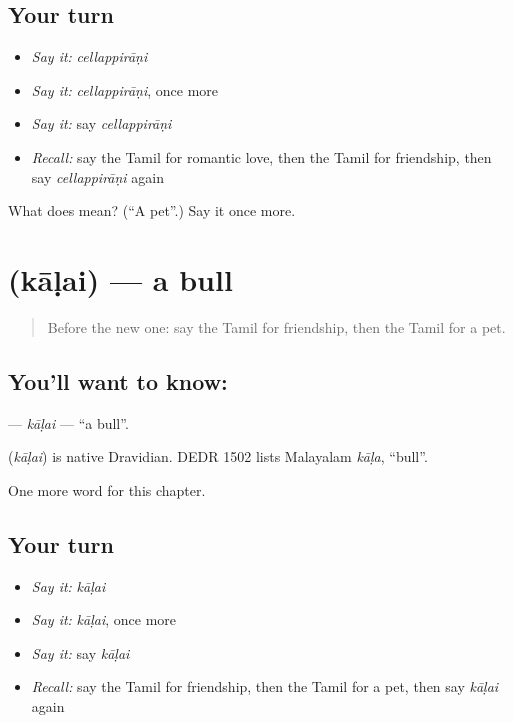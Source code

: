 \subsection*{Your turn}
\begin{itemize}
\raggedright
  \item \emph{Say it:} \emph{cellappirāṇi}
  \item \emph{Say it:} \emph{cellappirāṇi}, once more
  \item \emph{Say it:} say \emph{cellappirāṇi}
  \item \emph{Recall:} say the Tamil for romantic love, then the Tamil for friendship, then say \emph{cellappirāṇi} again
\end{itemize}

\begin{tcolorbox}[breakable,colback=teal!4,colframe=teal!35!black,title={Before you move on}]
What does  mean? (\textquotedblleft{}A pet\textquotedblright{}.) Say it once more.
\end{tcolorbox}
\section[\texorpdfstring{\ta{காளை} (kāḷai)}{காளை (kāḷai)}]{ (kāḷai) — a bull}

\label{lesson:TA-C187-kalai}



\begin{quote}
Before the new one: say the Tamil for friendship, then the Tamil for a pet.
\end{quote}

\subsection*{You'll want to know: }
\textbf{} — \emph{kāḷai} — \textquotedblleft{}a bull\textquotedblright{}.

\begin{cousinweb}
\textbf{} (\emph{kāḷai}) is native Dravidian. DEDR 1502 lists Malayalam \emph{kāḷa}, \textquotedblleft{}bull\textquotedblright{}.
\end{cousinweb}

\begin{grammarlens}[title={What you've built}]
One more word for this chapter.
\end{grammarlens}

\subsection*{Your turn}
\begin{itemize}
\raggedright
  \item \emph{Say it:} \emph{kāḷai}
  \item \emph{Say it:} \emph{kāḷai}, once more
  \item \emph{Say it:} say \emph{kāḷai}
  \item \emph{Recall:} say the Tamil for friendship, then the Tamil for a pet, then say \emph{kāḷai} again
\end{itemize}

